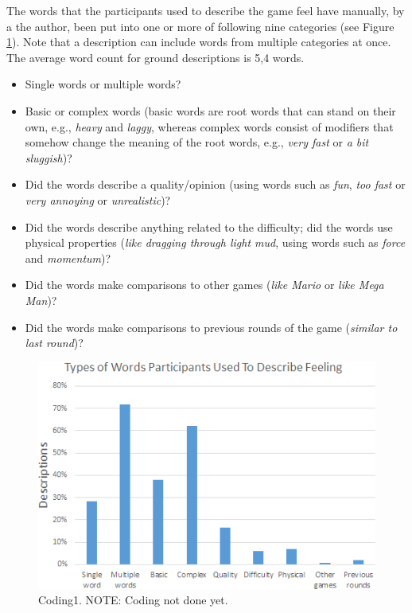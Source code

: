 The words that the participants used to describe the game feel have manually, by a the author, been put into one or more of following nine categories (see Figure \ref{fig:coding1}). Note that a description can include words from multiple categories at once. The average word count for ground descriptions is 5,4 words.
\begin{itemize}[noitemsep,nolistsep]
\item Single words or multiple words?
\item Basic or complex words (basic words are root words that can stand on their own, e.g., \textit{heavy} and \textit{laggy}, whereas complex words consist of modifiers that somehow change the meaning of the root words, e.g., \textit{very fast} or \textit{a bit sluggish})?
\item Did the words describe a quality/opinion (using words such as \textit{fun}, \textit{too fast} or \textit{very annoying} or \textit{unrealistic})?
\item Did the words describe anything related to the difficulty; did the words use physical properties (\textit{like dragging through light mud}, using words such as \textit{force} and \textit{momentum})?
\item Did the words make comparisons to other games (\textit{like Mario} or \textit{like Mega Man})?
\item Did the words make comparisons to previous rounds of the game (\textit{similar to last round})?
\end{itemize}

\begin{figure}[htbp]
\centering
\includegraphics[width=\columnwidth]{Pics/coding1}
\caption{Coding1. NOTE: Coding not done yet.}
\label{fig:coding1}
\end{figure}

